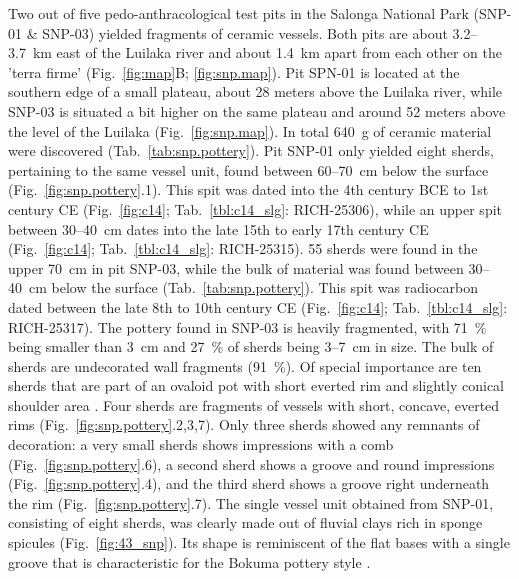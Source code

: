 \documentclass[a4paper]{article}
\begin{document}
Two out of five pedo-anthra\-cological test pits in the Salonga National Park (SNP-01 \& SNP-03) yielded fragments of ceramic vessels. Both pits are about 3.2--3.7~km east of the Luilaka river and about 1.4~km apart from each other on the 'terra firme' (Fig.~\ref{fig:map}B; \ref{fig:snp.map}). Pit SPN-01 is located at the southern edge of a small plateau, about 28 meters above the Luilaka river, while SNP-03 is situated a bit higher on the same plateau and around 52 meters above the level of the Luilaka (Fig.~\ref{fig:snp.map}). In total 640~g of ceramic material were discovered (Tab.~\ref{tab:snp.pottery}). Pit SNP-01 only yielded eight sherds, pertaining to the same vessel unit, found between 60--70~cm below the surface (Fig.~\ref{fig:snp.pottery}.1). This spit was dated into the 4th century BCE to 1st century CE (Fig.~\ref{fig:c14}; Tab.~\ref{tbl:c14_slg}: RICH-25306), while an upper spit between 30--40~cm dates into the late 15th to early 17th century CE (Fig.~\ref{fig:c14}; Tab.~\ref{tbl:c14_slg}: RICH-25315). 55 sherds were found in the upper 70~cm in pit SNP-03, while the bulk of material was found between 30--40~cm below the surface (Tab.~\ref{tab:snp.pottery}). This spit was radiocarbon dated between the late 8th to 10th century CE (Fig.~\ref{fig:c14}; Tab.~\ref{tbl:c14_slg}: RICH-25317). The pottery found in SNP-03 is heavily fragmented, with 71~\% being smaller than 3~cm and 27~\% of sherds being 3--7~cm in size. The bulk of sherds are undecorated wall fragments (91~\%). Of special importance are ten sherds that are part of an ovaloid pot with short everted rim and slightly conical shoulder area \citep[Fig.~\ref{fig:snp.pottery}.5; \textit{cf}. type B4][30 Fig.~5]{Seidensticker.2021e}. Four sherds are fragments of vessels with short, concave, everted rims (Fig.~\ref{fig:snp.pottery}.2,3,7). Only three sherds showed any remnants of decoration: a very small sherds shows impressions with a comb (Fig.~\ref{fig:snp.pottery}.6), a second sherd shows a groove and round impressions (Fig.~\ref{fig:snp.pottery}.4), and the third sherd shows a groove right underneath the rim (Fig.~\ref{fig:snp.pottery}.7). The single vessel unit obtained from SNP-01, consisting of eight sherds, was clearly made out of fluvial clays rich in sponge spicules (Fig.~\ref{fig:43_snp}). Its shape is reminiscent of the flat bases with a single groove that is characteristic for the Bokuma pottery style \citep[Fig.~\ref{fig:snp.pottery}.1; \textit{cf}. type B10][117, 440 Pl.~6]{Wotzka.1995}.
\end{document}
